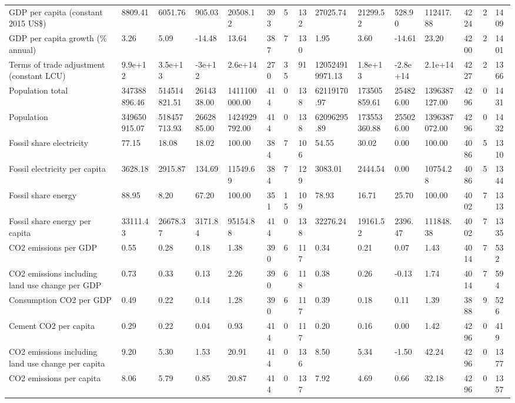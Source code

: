 \begin{longtable}{lllllllllllllll}
GDP per capita (constant 2015 US\$) & 8809.41 & 6051.76 & 905.03 & 20508.12 & 393 & 5 & 132 & 27025.74 & 21299.52 & 528.90 & 112417.88 & 4224 & 2 & 1409\\
\addlinespace
GDP per capita growth (\% annual) & 3.26 & 5.09 & -14.48 & 13.64 & 387 & 7 & 130 & 1.95 & 3.60 & -14.61 & 23.20 & 4200 & 2 & 1401\\
Terms of trade adjustment (constant LCU) & 9.9e+12 & 3.5e+13 & -3e+12 & 2.6e+14 & 270 & 35 & 91 & 120524919971.13 & 1.8e+13 & -2.8e+14 & 2.1e+14 & 4227 & 2 & 1366\\
Population total & 347388896.46 & 514514821.51 & 2614338.00 & 1411100000.00 & 414 & 0 & 138 & 62119170.97 & 173505859.61 & 254826.00 & 1396387127.00 & 4296 & 0 & 1431\\
Population & 349650915.07 & 518457713.93 & 2662885.00 & 1424929792.00 & 414 & 0 & 138 & 62096295.89 & 173553360.88 & 255026.00 & 1396387072.00 & 4296 & 0 & 1432\\
Fossil share electricity & 77.15 & 18.08 & 18.02 & 100.00 & 384 & 7 & 106 & 54.55 & 30.02 & 0.00 & 100.00 & 4086 & 5 & 1310\\
\addlinespace
Fossil electricity per capita & 3628.18 & 2915.87 & 134.69 & 11549.69 & 384 & 7 & 129 & 3083.01 & 2444.54 & 0.00 & 10754.28 & 4086 & 5 & 1344\\
Fossil share energy & 88.95 & 8.20 & 67.20 & 100.00 & 351 & 15 & 109 & 78.93 & 16.71 & 25.70 & 100.00 & 4002 & 7 & 1313\\
Fossil share energy per capita & 33111.43 & 26678.37 & 3171.84 & 95154.88 & 414 & 0 & 138 & 32276.24 & 19161.52 & 2396.47 & 111848.38 & 4002 & 7 & 1335\\
CO2 emissions per GDP & 0.55 & 0.28 & 0.18 & 1.38 & 390 & 6 & 117 & 0.34 & 0.21 & 0.07 & 1.43 & 4014 & 7 & 532\\
CO2 emissions including land use change per GDP & 0.73 & 0.33 & 0.13 & 2.26 & 390 & 6 & 118 & 0.38 & 0.26 & -0.13 & 1.74 & 4014 & 7 & 594\\
\addlinespace
Consumption CO2 per GDP & 0.49 & 0.22 & 0.14 & 1.28 & 390 & 6 & 117 & 0.39 & 0.18 & 0.11 & 1.39 & 3888 & 9 & 526\\
Cement CO2 per capita & 0.29 & 0.22 & 0.04 & 0.93 & 414 & 0 & 117 & 0.20 & 0.16 & 0.00 & 1.42 & 4296 & 0 & 419\\
CO2 emissions including land use change per capita & 9.20 & 5.30 & 1.53 & 20.91 & 414 & 0 & 136 & 8.50 & 5.34 & -1.50 & 42.24 & 4296 & 0 & 1377\\
CO2 emissions per capita & 8.06 & 5.79 & 0.85 & 20.87 & 414 & 0 & 137 & 7.92 & 4.69 & 0.66 & 32.18 & 4296 & 0 & 1357\\

\end{longtable}
